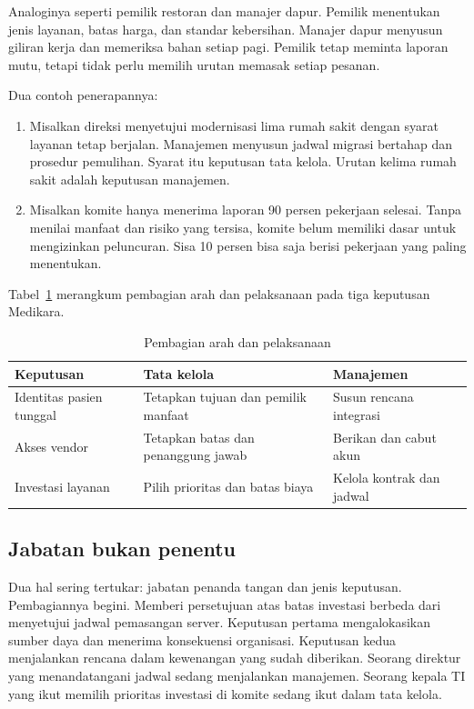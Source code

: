 Analoginya seperti pemilik restoran dan manajer dapur. Pemilik menentukan jenis layanan,
batas harga, dan standar kebersihan. Manajer dapur menyusun giliran kerja dan memeriksa
bahan setiap pagi. Pemilik tetap meminta laporan mutu, tetapi tidak perlu memilih urutan
memasak setiap pesanan.

Dua contoh penerapannya:
\begin{enumerate}
  \item Misalkan direksi menyetujui modernisasi lima rumah sakit dengan syarat layanan
  tetap berjalan. Manajemen menyusun jadwal migrasi bertahap dan prosedur pemulihan.
  Syarat itu keputusan tata kelola. Urutan kelima rumah sakit adalah keputusan manajemen.
  \item Misalkan komite hanya menerima laporan 90 persen pekerjaan selesai. Tanpa
  menilai manfaat dan risiko yang tersisa, komite belum memiliki dasar untuk mengizinkan
  peluncuran. Sisa 10 persen bisa saja berisi pekerjaan yang paling menentukan.
\end{enumerate}

Tabel~\ref{tab:ch01-peran} merangkum pembagian arah dan pelaksanaan pada tiga keputusan
Medikara.
\begin{table}[!htb]
  \centering\small
  \caption{Pembagian arah dan pelaksanaan}\label{tab:ch01-peran}
  \begin{tabularx}{\textwidth}{|>{\raggedright\arraybackslash}p{}|>{\raggedright\arraybackslash}X|>{\raggedright\arraybackslash}X|}
    \hline
    \textbf{Keputusan} & \textbf{Tata kelola} & \textbf{Manajemen} \\ \hline
    Identitas pasien tunggal & Tetapkan tujuan dan pemilik manfaat & Susun rencana
    integrasi \\ \hline
    Akses vendor & Tetapkan batas dan penanggung jawab & Berikan dan cabut akun \\
    \hline
    Investasi layanan & Pilih prioritas dan batas biaya & Kelola kontrak dan jadwal \\
    \hline
  \end{tabularx}
\end{table}

\subsection*{Jabatan bukan penentu}

Dua hal sering tertukar: jabatan penanda tangan dan jenis keputusan. Pembagiannya begini.
Memberi persetujuan atas batas investasi berbeda dari menyetujui jadwal pemasangan server.
Keputusan pertama mengalokasikan sumber daya dan menerima konsekuensi organisasi. Keputusan
kedua menjalankan rencana dalam kewenangan yang sudah diberikan. Seorang direktur yang
menandatangani jadwal sedang menjalankan manajemen. Seorang kepala TI yang ikut memilih
prioritas investasi di komite sedang ikut dalam tata kelola.

